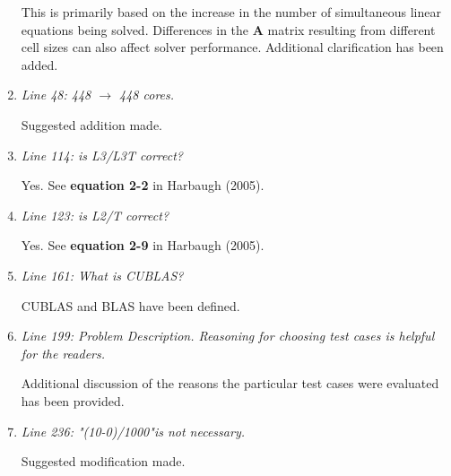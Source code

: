 \documentclass[12pt]{article} %
\begin{document}
\begin{enumerate}
This is primarily based on the increase in the number of simultaneous linear equations being solved. Differences in the \textbf{A} matrix resulting from different cell sizes can also affect solver performance. Additional clarification has been added. 

\item \textit{Line 48: 448 $\rightarrow$ 448 cores. } 

Suggested addition made.

\item \textit{Line 114: is L3/L3T correct? } 

Yes. See \textbf{equation 2-2} in Harbaugh (2005).

\item \textit{Line 123: is L2/T correct? } 

Yes. See \textbf{equation 2-9} in Harbaugh (2005).

\item \textit{Line 161: What is CUBLAS? } 

CUBLAS and BLAS have been defined.

\item \textit{Line 199: Problem Description. Reasoning for choosing test cases is helpful for the readers. } 

Additional discussion of the reasons the particular test cases were evaluated has been provided.

\item \textit{Line 236: "(10-0)/1000"is not necessary.} 

Suggested modification made.

\end{enumerate}
\end{document}
